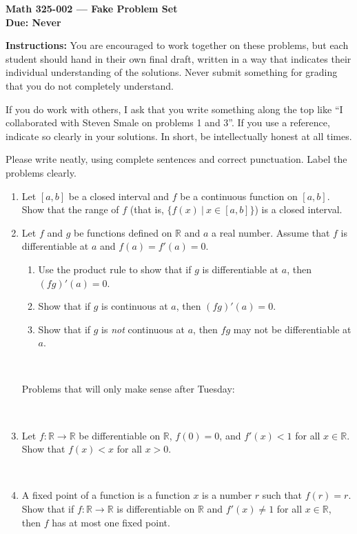 \documentclass{amsart}
\def\R{\mathbb R}
\begin{document}
\begin{center}
{\large\bfseries
Math 325-002 --- Fake Problem Set\\
Due: Never}
\end{center}





{\bf Instructions:} You are encouraged to work together on these
problems, but each student should hand in their own final draft,
written in a way that indicates their individual understanding of
the solutions. Never submit something for grading
that you do not completely understand. 

If you do work with others, I ask that you write something along the
top like ``I collaborated with Steven Smale on problems 1 and 3''.
If you use a reference, indicate so clearly in your solutions. 
In short, be intellectually
honest at all times.

Please write neatly, using complete sentences and correct
punctuation. Label the problems clearly. 




\begin{enumerate}


\item Let $[a,b]$ be a closed interval and $f$ be a continuous function on $[a,b]$. Show that the range of $f$ (that is, $\{ f(x) \ | \ x\in [a,b]\}$) is a closed interval.

\item Let $f$ and $g$ be functions defined on $\R$ and $a$ a real number. Assume that $f$ is differentiable at $a$ and $f(a) = f'(a)=0$.
\begin{enumerate}
\item Use the product rule to show that if $g$ is differentiable at $a$, then  $(fg)'(a)=0$.
\item Show that if $g$ is continuous at $a$, then $(fg)'(a)=0$.
\item Show that if $g$ is \emph{not} continuous at $a$, then $fg$ may not be differentiable at $a$.
\end{enumerate}

\

Problems that will only make sense after Tuesday:

\

\item Let $f:\R\to\R$ be differentiable  on $\R$, $f(0)=0$, and $f'(x)<1$ for all $x\in \R$. Show that $f(x)<x$ for all $x>0$.

\

\item A fixed point of a function is a function $x$ is a number $r$ such that $f(r)=r$. Show that if $f:\R\to \R$ is differentiable on $\R$ and $f'(x)\neq 1$ for all $x\in \R$, then $f$ has at most one fixed point.

\end{enumerate}
\end{document}
